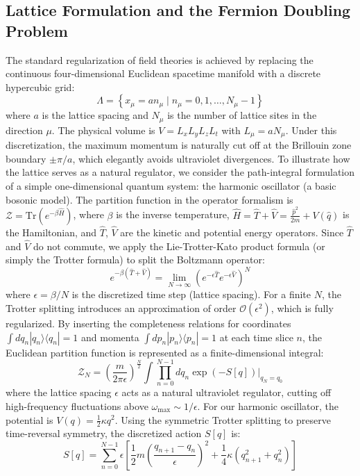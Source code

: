 \subsection{Lattice Formulation and the Fermion Doubling Problem}
The standard regularization of field theories is achieved by replacing the continuous four-dimensional Euclidean spacetime manifold with a discrete hypercubic grid:
\begin{equation}
\Lambda = \left\{ x_\mu = a n_\mu \mid n_\mu = 0, 1, \dots, N_\mu - 1 \right\}
\label{eq:lattice_grid}
\end{equation}
where $a$ is the lattice spacing and $N_\mu$ is the number of lattice sites in the direction $\mu$. The physical volume is $V = L_x L_y L_z L_t$ with $L_\mu = a N_\mu$. Under this discretization, the maximum momentum is naturally cut off at the Brillouin zone boundary $\pm \pi/a$, which elegantly avoids ultraviolet divergences. To illustrate how the lattice serves as a natural regulator, we consider the path-integral formulation of a simple one-dimensional quantum system: the harmonic oscillator (a basic bosonic model). The partition function in the operator formalism is $\mathcal{Z} = \mathrm{Tr}\left( e^{-\beta \hat{H}} \right)$, where $\beta$ is the inverse temperature, $\hat{H} = \hat{T} + \hat{V} = \frac{\hat{p}^2}{2m} + V(\hat{q})$ is the Hamiltonian, and $\hat{T}$, $\hat{V}$ are the kinetic and potential energy operators. Since $\hat{T}$ and $\hat{V}$ do not commute, we apply the Lie-Trotter-Kato product formula (or simply the Trotter formula) to split the Boltzmann operator:
\begin{equation}
e^{-\beta(\hat{T}+\hat{V})} = \lim_{N\to\infty} \left( e^{-\epsilon \hat{T}} e^{-\epsilon \hat{V}} \right)^N
\label{eq:trotter_formula}
\end{equation}
where $\epsilon = \beta/N$ is the discretized time step (lattice spacing). For a finite $N$, the Trotter splitting introduces an approximation of order $\mathcal{O}(\epsilon^2)$, which is fully regularized. By inserting the completeness relations for coordinates $\int dq_n |q_n\rangle\langle q_n| = 1$ and momenta $\int dp_n |p_n\rangle\langle p_n| = 1$ at each time slice $n$, the Euclidean partition function is represented as a finite-dimensional integral:
\begin{equation}
\mathcal{Z}_N = \left(\frac{m}{2 \pi \epsilon}\right)^{\frac{N}{2}} \int \prod_{n=0}^{N-1} dq_n \exp\left( -S[q] \right) \Big|_{q_N = q_0}
\label{eq:ho_partition}
\end{equation}
where the lattice spacing $\epsilon$ acts as a natural ultraviolet regulator, cutting off high-frequency fluctuations above $\omega_{\mathrm{max}} \sim 1/\epsilon$. For our harmonic oscillator, the potential is $V(q) = \frac{1}{2} \kappa q^2$. Using the symmetric Trotter splitting to preserve time-reversal symmetry, the discretized action $S[q]$ is:
\begin{equation}
S[q] = \sum_{n=0}^{N-1} \epsilon \left[ \frac{1}{2} m \left( \frac{q_{n+1} - q_n}{\epsilon} \right)^2 + \frac{1}{4} \kappa \left( q_{n+1}^2 + q_n^2 \right) \right]
\label{eq:ho_action}
\end{equation}

